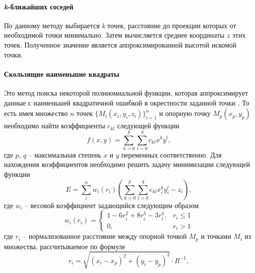          \paragraph{\textit{k}-ближайших соседей}
         По данному методу выбирается \textit{k} точек, расстояние до проекции которых от необходимой точки минимально. Затем вычисляется среднее координаты $ z $ этих точек. Полученное значение является аппроксимированной высотой искомой точки.
         
         
         \paragraph{Скользящие наименьшие квадраты}
         Это метод поиска некоторой полиномиальной функции, которая аппроксимирует данные с наименьшей квадратичной ошибкой в окрестности заданной точки \cite{Veerabhadra2017}. То есть имея множество $ n $ точек $ \{M_i(x_i, y_i, z_i)\}_{i=1}^{n} $ и опорную точку $ M_p(x_p, y_p) $ необходимо найти коэффициенты $ c_{kl} $ следующей функции
         \begin{equation}
             f(x,y)=\sum\limits_{k=0}^{p}\sum\limits_{l=0}^{q}c_{kl}x^ky^l,
         \end{equation}
         где $ p $, $ q $ -- максимальная степень $ x $ и $ y $ переменных соответственно.
         Для нахождения коэффициентов необходимо решить задачу минимизации следующей функции
         \begin{equation}
             E = \sum\limits_{i}^{n}w_i(r_i)\left(\sum\limits_{k=0}^{p}\sum\limits_{l=0}^{q}c_{kl}x_i^k y_i^l - z_i\right),
         \end{equation}
         где $ w_i $ -- весовой коэффициент задающийся следующим образом
         \begin{equation}
            w_i(r_i) = 
                     \begin{cases}
                         1-6r_i^2+8r_i^3-3r_i^4, &r_i \le 1\\
                         0, &r_i > 1
                     \end{cases}
         \end{equation}
         где $ r_i $ -- нормализованное расстояние между опорной точкой $ M_p $ и точками $ M_i $ из множества, рассчитываемое по формуле
         \begin{equation}
             r_i = \sqrt{(x_i-x_p)^2 + (y_i-y_p)^2}\cdot R^{-1},
         \end{equation}
